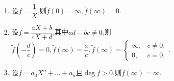 \begin{example}{}{}
	\begin{enumerate}
		\item 设$f=\dfrac{1}{X}$,则$\tilde{f}\left(0\right)=\infty,\tilde{f}\left(\infty\right)=0$.
		\item 设$f=\dfrac{aX+b}{cX+d}$,其中$ad-bc\neq 0$,则$\tilde{f}\left(-\dfrac{d}{c}\right)=0,\tilde{f}\left(\infty\right)=\dfrac{a}{c},\tilde{f}\left(\infty\right)=
		\begin{cases}
			\infty,&c\neq 0,\\
			0,&c=0.
		\end{cases}$.
		\item 设$f=a_{0}X^{n}+\ldots+a_{n}$且$\deg f>0$,则$\tilde{f}\left(\infty\right)=\infty$.
	\end{enumerate}
\end{example}









































